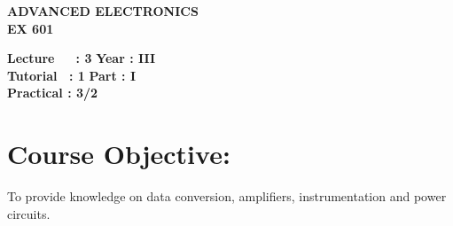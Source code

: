 \begin{center}
    \textbf{\huge{\uppercase{Advanced Electronics}}}
    \\
    \vspace{.5cm}
    \textbf{\large{EX 601}}
\end{center}

\noindent\textbf{Lecture\ \ \ : 3} \hfill \textbf{Year : III} \\
\textbf{Tutorial \ : 1} \hfill \textbf{Part : I } \\
\textbf{Practical : 3/2}  \\

\par
\noindent 
\section*{Course Objective:}
To provide knowledge on data conversion, amplifiers, instrumentation and power circuits.

